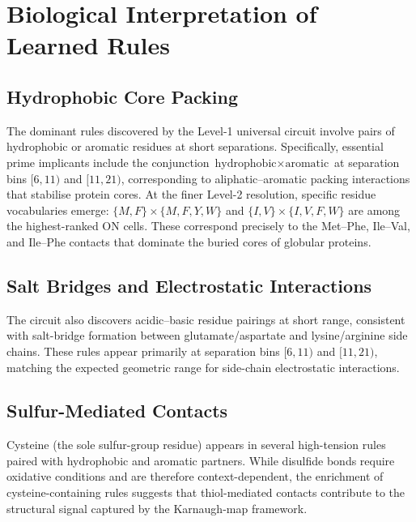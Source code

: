 \section{Biological Interpretation of Learned Rules}
\label{sec:methods-biological}

\subsection{Hydrophobic Core Packing}
The dominant rules discovered by the Level-1 universal circuit involve pairs
of hydrophobic or aromatic residues at short separations.  Specifically,
essential prime implicants include the conjunction
$\text{hydrophobic} \times \text{aromatic}$ at separation bins $[6, 11)$ and
$[11, 21)$, corresponding to aliphatic--aromatic packing interactions that
stabilise protein cores.  At the finer Level-2 resolution, specific residue
vocabularies emerge: $\{M, F\} \times \{M, F, Y, W\}$ and
$\{I, V\} \times \{I, V, F, W\}$ are among the highest-ranked ON cells.
These correspond precisely to the Met--Phe, Ile--Val, and Ile--Phe contacts
that dominate the buried cores of globular proteins.

\subsection{Salt Bridges and Electrostatic Interactions}
The circuit also discovers acidic--basic residue pairings at short range,
consistent with salt-bridge formation between glutamate/aspartate and
lysine/arginine side chains.  These rules appear primarily at separation bins
$[6, 11)$ and $[11, 21)$, matching the expected geometric range for
side-chain electrostatic interactions.

\subsection{Sulfur-Mediated Contacts}
Cysteine (the sole sulfur-group residue) appears in several high-tension
rules paired with hydrophobic and aromatic partners.  While disulfide bonds
require oxidative conditions and are therefore context-dependent, the
enrichment of cysteine-containing rules suggests that thiol-mediated contacts
contribute to the structural signal captured by the Karnaugh-map framework.

